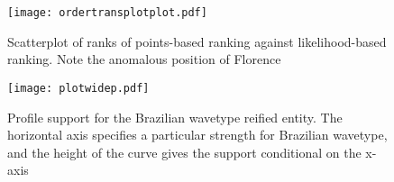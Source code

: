 \documentclass{article}
\begin{document}
\clearpage
\newpage

\begin{figure}[h]
\texttt{[image: ordertransplotplot.pdf]}
\caption{Scatterplot of ranks \label{compare_likelihood_points_rankings} of points-based ranking
against likelihood-based ranking.  Note the anomalous position of
Florence}
\end{figure}

\clearpage
\newpage

\begin{figure}[h]
  \texttt{[image: plotwidep.pdf]}
\caption{Profile support \label{brazilian_wavetype_support} for the
  Brazilian wavetype reified entity.  The horizontal axis specifies a
  particular strength for Brazilian wavetype, and the height of the
  curve gives the support conditional on the x-axis}
\end{figure}
\end{document}
